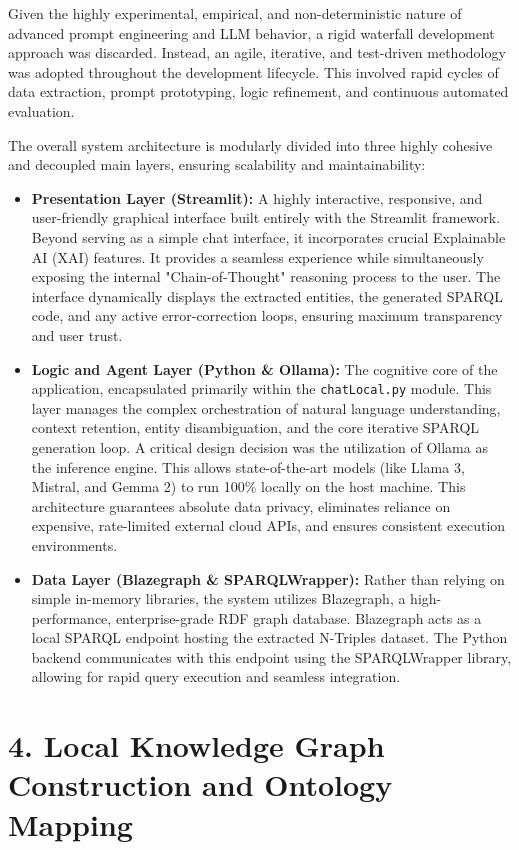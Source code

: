 Given the highly experimental, empirical, and non-deterministic nature of advanced prompt engineering and LLM behavior, a rigid waterfall development approach was discarded. Instead, an agile, iterative, and test-driven methodology was adopted throughout the development lifecycle. This involved rapid cycles of data extraction, prompt prototyping, logic refinement, and continuous automated evaluation.

The overall system architecture is modularly divided into three highly cohesive and decoupled main layers, ensuring scalability and maintainability:

\begin{itemize}
    \item \textbf{Presentation Layer (Streamlit):} A highly interactive, responsive, and user-friendly graphical interface built entirely with the Streamlit framework. Beyond serving as a simple chat interface, it incorporates crucial Explainable AI (XAI) features. It provides a seamless experience while simultaneously exposing the internal "Chain-of-Thought" reasoning process to the user. The interface dynamically displays the extracted entities, the generated SPARQL code, and any active error-correction loops, ensuring maximum transparency and user trust.
    \item \textbf{Logic and Agent Layer (Python \& Ollama):} The cognitive core of the application, encapsulated primarily within the \texttt{chatLocal.py} module. This layer manages the complex orchestration of natural language understanding, context retention, entity disambiguation, and the core iterative SPARQL generation loop. A critical design decision was the utilization of Ollama as the inference engine. This allows state-of-the-art models (like Llama 3, Mistral, and Gemma 2) to run 100\% locally on the host machine. This architecture guarantees absolute data privacy, eliminates reliance on expensive, rate-limited external cloud APIs, and ensures consistent execution environments.
    \item \textbf{Data Layer (Blazegraph \& SPARQLWrapper):} Rather than relying on simple in-memory libraries, the system utilizes Blazegraph, a high-performance, enterprise-grade RDF graph database. Blazegraph acts as a local SPARQL endpoint hosting the extracted N-Triples dataset. The Python backend communicates with this endpoint using the SPARQLWrapper library, allowing for rapid query execution and seamless integration.
\end{itemize}

\section*{4. Local Knowledge Graph Construction and Ontology Mapping}

